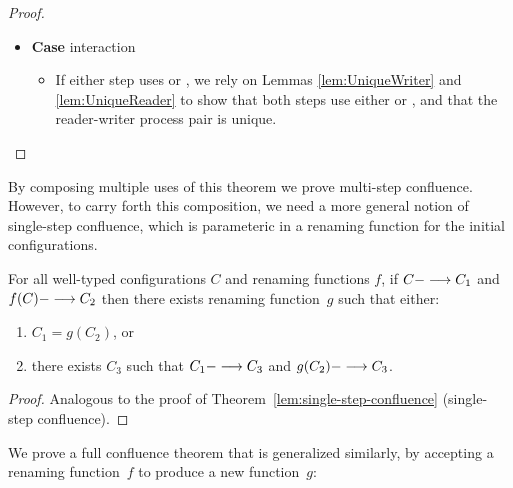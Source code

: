 \begin{theorem}
\begin{proof}
\begin{itemize}[leftmargin=*]
   \item[] \textbf{Case} interaction
     \begin{itemize}[leftmargin=*]
       \item[] If either step uses  or , we rely on Lemmas
         \ref{lem:UniqueWriter} and \ref{lem:UniqueReader} to show that both
         steps use either  or , and that the reader-writer
         process pair is unique.
     \end{itemize}
   \end{itemize}
\end{proof}
\end{theorem}

By composing multiple uses of this theorem
we prove multi-step confluence.
However, to carry forth this composition, we need a more general
notion of single-step confluence, which is parameteric in a renaming
function for the initial configurations.

\begin{theorem}
For all well-typed configurations $C$ 
and renaming functions $f$,
%
 if $C ---> C_1$ 
and $f(C) ---> C_2$ 
then 
there exists renaming function~$g$ 
such that either:
\begin{enumerate}
\item %
$C_1 = g(C_2)$,
or
\item there exists $C_3$ such that $C_1 ---> C_3$ and $g(C_2) ---> C_3$.
\end{enumerate}
\begin{proof}
  Analogous to the proof of Theorem~\ref{lem:single-step-confluence}
  (single-step confluence).
\end{proof}
\end{theorem}

We prove a full confluence theorem that is generalized similarly, by
accepting a renaming function~$f$ to produce a new function~$g$:

